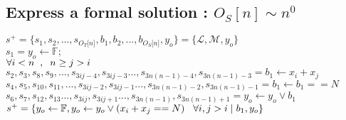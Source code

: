 \documentclass[11pt]{article}
\begin{document}
\subsection{Express a formal solution : $O_S[n] \sim n^0$}
\begin{center}
\vspace{1.5mm}
$
s^+ = \{ s_1,s_2,...,s_{O_T \lbrack n \rbrack }, b_1, b_2,...,b_{O_S \lbrack n \rbrack},y_o \} = \{ \mathcal{L},\mathcal{M},y_o\}
$
\\ \vspace{2mm}
$
s_1 = y_o \leftarrow \mathbb{F};
$
\\ \vspace{2mm}
$
\forall i < n \hspace{2mm}, \hspace{2mm} n \geq j > i 
$
\\ \vspace{2mm}
$
s_2,s_3,s_8,s_9,...,s_{3ij-4},s_{3ij-3}...,s_{3n(n-1)-4},s_{3n(n-1)-3} =  b_1 \leftarrow x_i + x_j 
$
\\ \vspace{2mm}
$
s_4,s_5,s_{10},s_{11},...,s_{3ij-2},s_{3ij-1}...,s_{3n(n-1)-2},s_{3n(n-1)-1} = b_1 \leftarrow b_1 == N
$
\\ \vspace{2mm}
$
s_6,s_7,s_{12},s_{13}...,s_{3ij},s_{3ij+1}...,s_{3n(n-1)},s_{3n(n-1)+1} = y_o \leftarrow y_o \lor b_1
$
\\ \vspace{2mm}
$
s^+ = \{y_o \leftarrow \mathbb{F},y_o \leftarrow y_o \lor (x_i + x_j == N) \hspace{3mm} \forall i,j > i \hspace{1mm}| \hspace{1mm} b_1,y_o\}
$
\end{center}
\end{document}
